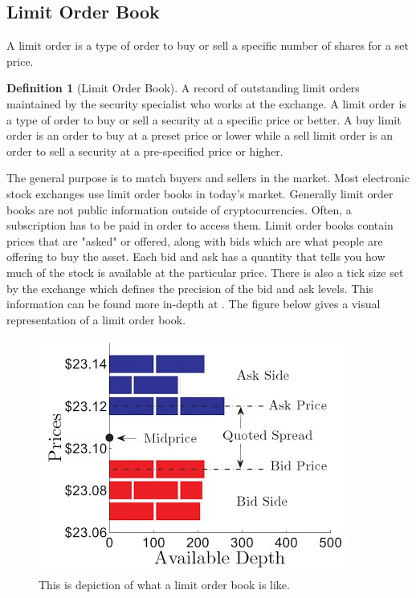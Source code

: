 \documentclass{article}
\theoremstyle{plain}
\theoremstyle{definition}
\newtheorem{definition}{Definition}
\numberwithin{equation}{section}
\numberwithin{theorem}{section}
\numberwithin{lemma}{section}
\numberwithin{definition}{section}
\numberwithin{proposition}{section}
\numberwithin{corollary}{section}
\begin{document}
	\subsection{Limit Order Book}
	A limit order is a type of order to buy or sell a specific number of shares for a set price.
	\begin{definition}[Limit Order Book]
		 A record of outstanding limit orders maintained by the security specialist who works at the exchange. A limit order is a type of order to buy or sell a security at a specific price or better. A buy limit order is an order to buy at a preset price or lower while a sell limit order is an order to sell a security at a pre-specified price or higher.
	\end{definition}
	
	The general purpose is to match buyers and sellers in the market. Most electronic stock exchanges use limit order books in today's market. Generally limit order books are not public information outside of cryptocurrencies. Often, a subscription has to be paid in order to access them. Limit order books contain prices that are "asked" or offered, along with bids which are what people are offering to buy the asset. Each bid and ask has a quantity that tells you how much of the stock is available at the particular price. There is also a tick size set by the exchange which defines the precision of the bid and ask levels. This information can be found more in-depth at \cite{tradientblog.com_2020}. The figure below gives a visual representation of a limit order book.
	
	\begin{figure}[h]
		\includegraphics[width=\linewidth]{lobex2}
		\caption{This is depiction of what a limit order book is like. \cite{quantstart}}
	\end{figure}
\end{document}
